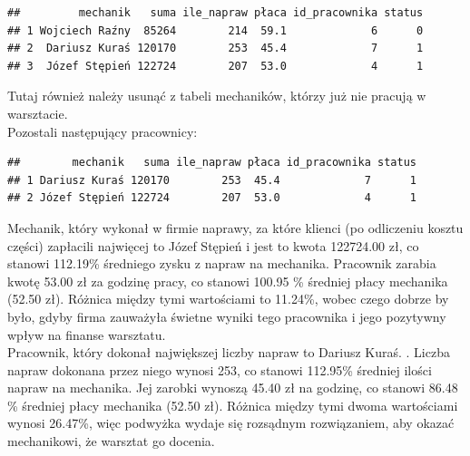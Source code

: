 \documentclass{article}\usepackage[]{graphicx}\usepackage[]{xcolor}
\makeatletter
\newenvironment{kframe}{%
 \def\at@end@of@kframe{}%
 \ifinner\ifhmode%
  \def\at@end@of@kframe{\end{minipage}}%
  \begin{minipage}{\columnwidth}%
 \fi\fi%
 \def\FrameCommand##1{\hskip\@totalleftmargin \hskip-\fboxsep
 \colorbox{shadecolor}{##1}\hskip-\fboxsep
     \hskip-\linewidth \hskip-\@totalleftmargin \hskip\columnwidth}%
 \MakeFramed {\advance\hsize-\width
   \@totalleftmargin\z@ \linewidth\hsize
   \@setminipage}}%
 {\par\unskip\endMakeFramed%
 \at@end@of@kframe}
\newenvironment{knitrout}{}{} %
\makeatother
\begin{document}
\begin{knitrout}
\color{fgcolor}\begin{kframe}
\begin{verbatim}
##         mechanik   suma ile_napraw płaca id_pracownika status
## 1 Wojciech Raźny  85264        214  59.1             6      0
## 2  Dariusz Kuraś 120170        253  45.4             7      1
## 3  Józef Stępień 122724        207  53.0             4      1
\end{verbatim}
\end{kframe}
\end{knitrout}


Tutaj również należy usunąć z tabeli mechaników, którzy już nie pracują w warsztacie. \\

Pozostali następujący pracownicy:

\begin{knitrout}
\color{fgcolor}\begin{kframe}
\begin{verbatim}
##        mechanik   suma ile_napraw płaca id_pracownika status
## 1 Dariusz Kuraś 120170        253  45.4             7      1
## 2 Józef Stępień 122724        207  53.0             4      1
\end{verbatim}
\end{kframe}
\end{knitrout}

Mechanik, który wykonał w firmie naprawy, za które klienci (po odliczeniu kosztu części) zapłacili najwięcej to Józef Stępień i jest to kwota 122724.00 zł, co stanowi 112.19\% średniego zysku z napraw na mechanika. Pracownik zarabia kwotę 53.00 zł za godzinę pracy, co stanowi 100.95 \% średniej płacy mechanika (52.50 zł). Różnica między tymi wartościami to 11.24\%, wobec czego dobrze by było, gdyby firma zauważyła świetne wyniki tego pracownika i jego pozytywny wpływ na finanse warsztatu. \\

Pracownik, który dokonał największej liczby napraw to Dariusz Kuraś. . Liczba napraw dokonana przez niego wynosi 253, co stanowi 112.95\% średniej ilości napraw na mechanika. Jej zarobki wynoszą 45.40 zł na godzinę, co stanowi 86.48 \% średniej płacy mechanika (52.50 zł). Różnica między tymi dwoma wartościami wynosi 26.47\%, więc podwyżka wydaje się rozsądnym rozwiązaniem, aby okazać mechanikowi, że warsztat go docenia.
\end{document}
